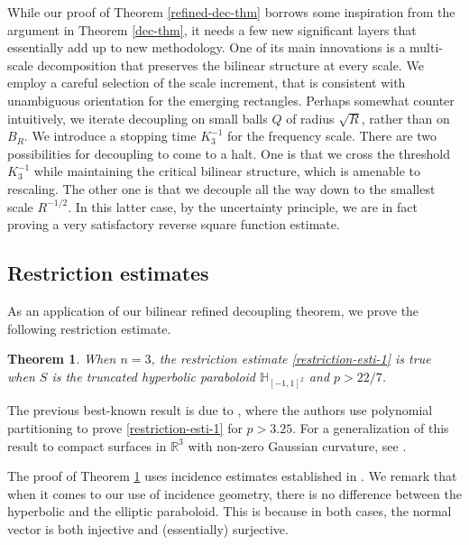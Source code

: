 \documentclass{amsart}%
\numberwithin{equation}{section}
\newtheorem{theorem}{Theorem}[section]
\newcommand{\ZR}{\mathbb{R}}
\newcommand{\ZH}{\mathbb{H}}
\newcommand{\1}{\mathbbm{1}}
\begin{document}
While our proof of Theorem \ref{refined-dec-thm} borrows some inspiration from the argument in Theorem \ref{dec-thm}, it needs a few new significant layers that essentially add up to new methodology. 
One of its main innovations is a multi-scale decomposition that preserves the bilinear structure at every scale. We employ a careful selection of the scale increment, that is consistent with unambiguous orientation for the emerging rectangles.
Perhaps somewhat counter intuitively, we iterate decoupling on small balls $Q$ of radius $\sqrt{R}$, rather than on $B_R$. We introduce a stopping time $K_3^{-1}$ for the frequency scale. There are two possibilities for decoupling to come to a halt. 
One is that we cross the threshold $K_3^{-1}$ while maintaining the critical bilinear structure, which is amenable to rescaling. The other one is that we decouple all the way down to the smallest scale $R^{-1/2}$. In this latter case, by the uncertainty principle, we are in fact proving a very satisfactory reverse square function estimate.






\medskip


\subsection{Restriction estimates}

As an application of our bilinear refined decoupling theorem, we prove the following restriction estimate.
\begin{theorem}
\label{restriction-thm}
When $n=3$, the restriction estimate \eqref{restriction-esti-1} is true when $S$ is the truncated hyperbolic paraboloid $\ZH_{[-1,1]^2}
$ and $p>22/7$. 
\end{theorem}



The previous best-known result is due to \cite{Cho-Lee}, where the authors use polynomial partitioning to prove \eqref{restriction-esti-1} for $p>3.25$.
For a generalization of this result to compact surfaces in $\ZR^3$ with non-zero Gaussian curvature, see \cite{Guo-Oh}.


\smallskip

The proof of Theorem \ref{restriction-thm} uses incidence estimates established in \cite{Wang-Wu}.
We remark that when it comes to our use of incidence geometry, there is no difference between the hyperbolic and the elliptic paraboloid. This is because in both cases, the normal vector is both injective and (essentially) surjective.  
\end{document}
